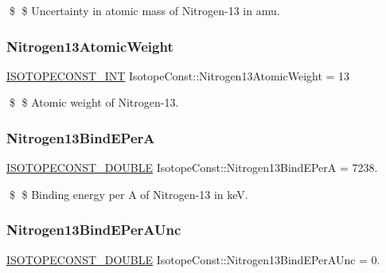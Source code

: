 \$ \$ Uncertainty in atomic mass of Nitrogen-\/13 in amu. \mbox{\label{group___isotope_const-_nitrogen-_n13_ga1a08065767452273a557c2c4d35e5762}} 
\subsubsection{\texorpdfstring{Nitrogen13\+Atomic\+Weight}{Nitrogen13AtomicWeight}}
{\footnotesize\ttfamily \mbox{\hyperlink{group___isotope_const-_macros_ga5f18360b3e99483a35c32d789e62621c}{I\+S\+O\+T\+O\+P\+E\+C\+O\+N\+S\+T\+\_\+\+I\+NT}} Isotope\+Const\+::\+Nitrogen13\+Atomic\+Weight = 13}

\$ \$ Atomic weight of Nitrogen-\/13. \mbox{\label{group___isotope_const-_nitrogen-_n13_ga25fe3f60385e543f694b1e5fdf88c04f}} 
\subsubsection{\texorpdfstring{Nitrogen13\+Bind\+E\+PerA}{Nitrogen13BindEPerA}}
{\footnotesize\ttfamily \mbox{\hyperlink{group___isotope_const-_macros_ga8f45a7272ce02c0b4c65c44636ed719a}{I\+S\+O\+T\+O\+P\+E\+C\+O\+N\+S\+T\+\_\+\+D\+O\+U\+B\+LE}} Isotope\+Const\+::\+Nitrogen13\+Bind\+E\+PerA = 7238.}

\$ \$ Binding energy per A of Nitrogen-\/13 in keV. \mbox{\label{group___isotope_const-_nitrogen-_n13_ga4abd1fc429c2b243a68b8fb09ef8a1d2}} 
\subsubsection{\texorpdfstring{Nitrogen13\+Bind\+E\+Per\+A\+Unc}{Nitrogen13BindEPerAUnc}}
{\footnotesize\ttfamily \mbox{\hyperlink{group___isotope_const-_macros_ga8f45a7272ce02c0b4c65c44636ed719a}{I\+S\+O\+T\+O\+P\+E\+C\+O\+N\+S\+T\+\_\+\+D\+O\+U\+B\+LE}} Isotope\+Const\+::\+Nitrogen13\+Bind\+E\+Per\+A\+Unc = 0.}

